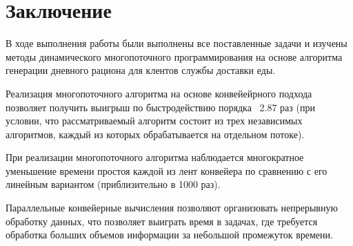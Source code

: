 \chapter*{Заключение}

В ходе выполнения работы были выполнены все поставленные задачи и изучены методы динамического многопоточного программирования на основе алгоритма генерации дневного рациона для клентов службы доставки еды.

Реализация многопоточного алгоритма на основе конвейейрного подхода позволяет получить выигрыш по быстродействию порядка ~2.87 раз (при условии, что рассматриваемый алгоритм состоит из трех независимых алгоритмов, каждый из которых обрабатывается на отдельном потоке).

При реализации многопоточного алгоритма наблюдается многократное уменьшение времени простоя каждой из лент конвейера по сравнению с его линейным вариантом (приблизительно в 1000 раз).

Параллельные конвейерные вычисления позволяют организовать непрерывную обработку данных, что позволяет выиграть время в задачах, где требуется обработка больших объемов информации за небольшой промежуток времени.

